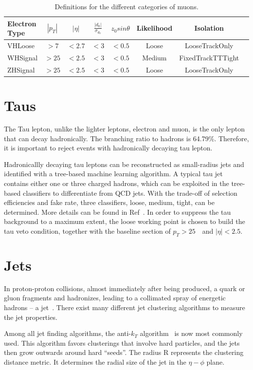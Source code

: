 \begin{table}[tbh]
    \centering
    \begin{tabular}{|l|c|c|c|c|c|c|c}
        \hline
        Electron Type & $|p_T|$ &$|\eta|$ & $\frac{|d_0|}{\sigma_{d_0}}$&$z_0 sin\theta$ & Likelihood &Isolation \\
        \hline
        VHLoose &$>7$&$<2.7$&$<3$&$<0.5$&Loose&LooseTrackOnly\\
        \hline
        WHSignal &$>25$&$<2.5$&$<3$&$<0.5$&Medium&FixedTrackTTTight\\
        \hline
        ZHSignal &$>25$&$<2.5$&$<3$&$<0.5$&Loose&LooseTrackOnly\\
        \hline
    \end{tabular}
    \caption{Definitions for the different categories of muons.}
    \label{tab:mu}
\end{table}

\section{Taus}
\label{sec:taus}

\par The Tau lepton, unlike the lighter leptons, electron and muon, 
is the only lepton that can decay hadronically. The branching ratio to hadrons is 64.79\%. Therefore, it is important to reject events with hadronically decaying tau lepton.

\par Hadronicallly decaying tau leptons can be reconstructed as small-radius jets and identified with a tree-based machine learning algorithm. A typical tau jet 
contains either one or three charged hadrons, which can be exploited in the tree-based classifiers to differentiate from QCD jets. With the trade-off of selection 
efficiencies and fake rate, three classifiers, loose, medium, tight, can be determined. More details can be found in Ref~\cite{ATL-PHYS-PUB-2015-045}. 
In order to suppress the tau background to a maximum extent, the loose working point is chosen to build the tau veto condition, together with the baseline section of $p_T > 25$~\GeV~and $|\eta| < 2.5$.

\section{Jets}
\label{sec:jets}

\par In proton-proton collisions, almost immediately after being produced, a quark or gluon fragments and hadronizes, leading to a collimated spray of energetic hadrons -- 
a jet~\cite{Salam:2009jx}. There exist many different jet clustering algorithms to measure the jet properties. 
\par Among all jet finding algorithms, the anti-$k_T$ algorithm~\cite{Cacciari:2008gn} is now most commonly used. This algorithm favors clusterings that involve hard particles, 
and the jets then grow outwards around hard ``seeds''. The radius R represents the clustering distance metric. It determines the radial size of the jet in the $\eta-\phi$ plane.

